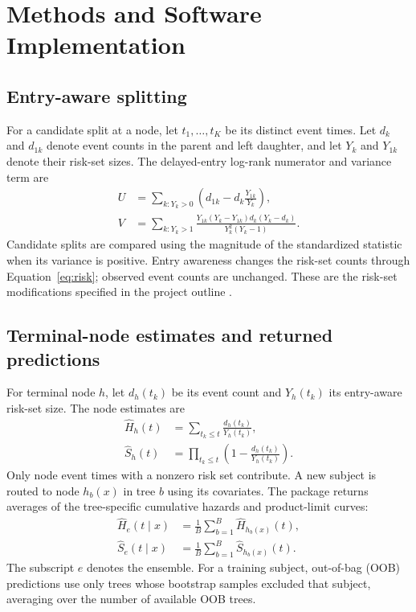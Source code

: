 \chapter{Methods and Software Implementation}
\section{Entry-aware splitting}
For a candidate split at a node, let $t_1,\ldots,t_K$ be its distinct event
times. Let $d_k$ and $d_{1k}$ denote event counts in the parent and left
daughter, and let $Y_k$ and $Y_{1k}$ denote their risk-set sizes. The
delayed-entry log-rank numerator and variance term are
\begin{align}
 U&=\sum_{k:Y_k>0}\left(d_{1k}-d_k\frac{Y_{1k}}{Y_k}\right),\\
 V&=\sum_{k:Y_k>1}
 \frac{Y_{1k}(Y_k-Y_{1k})d_k(Y_k-d_k)}{Y_k^2(Y_k-1)}.
\end{align}
Candidate splits are compared using the magnitude of the standardized
statistic when its variance is positive. Entry awareness changes the
risk-set counts through Equation~\eqref{eq:risk}; observed event counts are
unchanged. These are the risk-set modifications specified in the
project outline \citep{projectoutline}.

\section{Terminal-node estimates and returned predictions}
For terminal node $h$, let $d_h(t_k)$ be its event count and $Y_h(t_k)$ its
entry-aware risk-set size. The node estimates are
\begin{align}
 \widehat H_h(t)&=\sum_{t_k\leq t}\frac{d_h(t_k)}{Y_h(t_k)},\\
 \widehat S_h(t)&=\prod_{t_k\leq t}
       \left(1-\frac{d_h(t_k)}{Y_h(t_k)}\right).
\end{align}
Only node event times with a nonzero risk set contribute. A new subject is
routed to node $h_b(x)$ in tree $b$ using its covariates. The package returns
averages of the tree-specific cumulative hazards and product-limit curves:
\begin{align}
 \widehat H_e(t\mid x)&=\frac{1}{B}\sum_{b=1}^{B}\widehat H_{h_b(x)}(t),\\
 \widehat S_e(t\mid x)&=\frac{1}{B}\sum_{b=1}^{B}\widehat S_{h_b(x)}(t).
\end{align}
The subscript $e$ denotes the ensemble. For a training subject,
out-of-bag (OOB) predictions use only trees whose bootstrap samples
excluded that subject, averaging over the number of available OOB trees.

